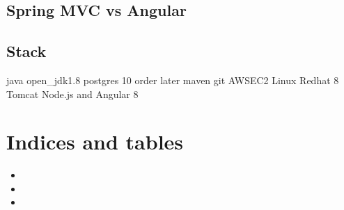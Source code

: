 \documentclass[letterpaper,10pt,english]{sphinxmanual}
\begin{document}
\section{Spring MVC vs Angular}
\label{\detokenize{Technology:spring-mvc-vs-angular}}

\section{Stack}
\label{\detokenize{Technology:stack}}
java open\_jdk1.8
postgres 10 order later
maven
git
AWSEC2
Linux Redhat 8
Tomcat
Node.js and Angular 8


\chapter{Indices and tables}
\label{\detokenize{index:indices-and-tables}}\begin{itemize}
\item {} 

\item {} 

\item {} 

\end{itemize}



\renewcommand{\indexname}{Index}
\printindex
\end{document}
